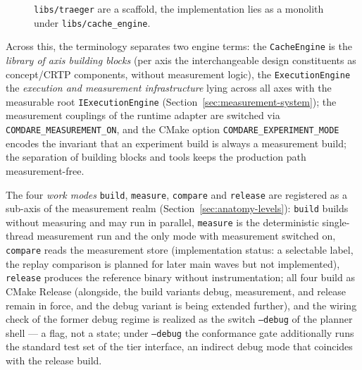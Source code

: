 \begin{nurkurz}
\begin{figure}[htbp]
{\texttt{libs/traeger} are a scaffold, the implementation lies as a monolith under
\texttt{libs/cache\_engine}.}\label{fig:traeger-stufen}
\end{figure}
Across this, the terminology separates two engine terms: the \texttt{CacheEngine} is the \emph{library
of axis building blocks} (per axis the interchangeable design constituents as concept/CRTP components,
without measurement logic), the \texttt{ExecutionEngine} the \emph{execution and measurement
infrastructure} lying across all axes with the measurable root \texttt{IExecutionEngine}
(Section~\ref{sec:measurement-system}); the measurement couplings of the runtime adapter are switched
via \texttt{COMDARE\_\allowbreak{}MEASUREMENT\_\allowbreak{}ON}, and the CMake option
\texttt{COMDARE\_\allowbreak{}EXPERIMENT\_\allowbreak{}MODE} encodes the invariant that an experiment
build is always a measurement build; the separation of building blocks and tools keeps the production
path measurement-free.

The four \emph{work modes} \texttt{build}, \texttt{measure}, \texttt{compare} and \texttt{release} are
registered as a sub-axis of the measurement realm (Section~\ref{sec:anatomy-levels}): \texttt{build}
builds without measuring and may run in parallel, \texttt{measure} is the deterministic single-thread
measurement run and the only mode with measurement switched on, \texttt{compare} reads the measurement
store (implementation status: a selectable label, the replay comparison is planned for later main
waves but not implemented), \texttt{release} produces the reference binary without instrumentation;
all four build as CMake Release (alongside, the build variants debug, measurement, and release remain
in force, and the debug variant is being extended further), and the wiring check of the former debug regime is realized as the switch \texttt{--debug} of
the planner shell --- a flag, not a state; under \texttt{--debug} the conformance gate additionally runs
the standard test set of the tier interface, an indirect debug mode that coincides with the release build.
\end{nurkurz}

